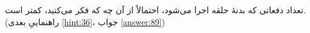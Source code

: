 \section{}
\paragraph{}\label{hint:20}
تعداد دفعاتی که بدنهٔ حلقه اجرا می‌شود، احتمالاً از آن چه که فکر می‌کنید، کمتر است. (راهنماییِ بعدی \ref{hint:36}، جواب \ref{answer:89})